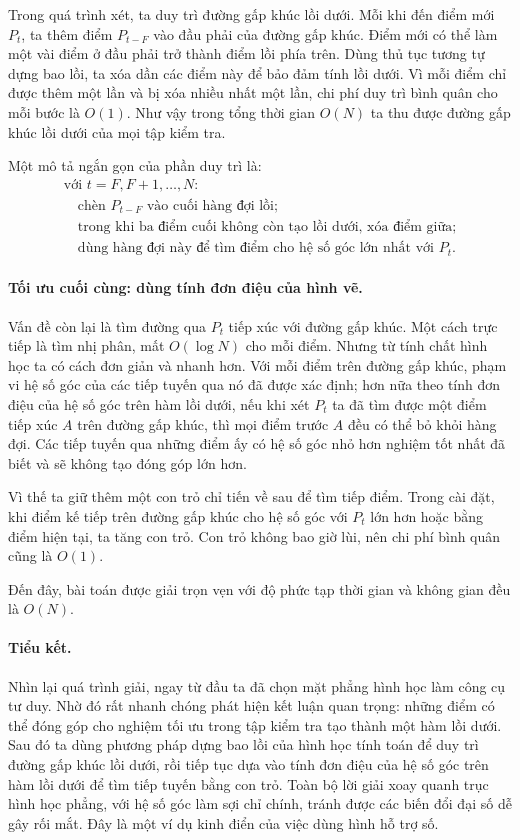 \documentclass[11pt]{article}
\begin{document}
Trong quá trình xét, ta duy trì đường gấp khúc lồi dưới. Mỗi khi đến điểm
mới $P_t$, ta thêm điểm $P_{t-F}$ vào đầu phải của đường gấp khúc. Điểm mới
có thể làm một vài điểm ở đầu phải trở thành điểm lồi phía trên. Dùng thủ
tục tương tự dựng bao lồi, ta xóa dần các điểm này để bảo đảm tính lồi dưới.
Vì mỗi điểm chỉ được thêm một lần và bị xóa nhiều nhất một lần, chi phí duy
trì bình quân cho mỗi bước là $O(1)$. Như vậy trong tổng thời gian $O(N)$ ta
thu được đường gấp khúc lồi dưới của mọi tập kiểm tra.

Một mô tả ngắn gọn của phần duy trì là:
\[
\begin{array}{l}
\text{với }t=F,F+1,\ldots,N\text{:}\\
\quad \text{chèn }P_{t-F}\text{ vào cuối hàng đợi lồi;}\\
\quad \text{trong khi ba điểm cuối không còn tạo lồi dưới, xóa điểm giữa;}\\
\quad \text{dùng hàng đợi này để tìm điểm cho hệ số góc lớn nhất với }P_t.
\end{array}
\]

\paragraph{Tối ưu cuối cùng: dùng tính đơn điệu của hình vẽ.}
Vấn đề còn lại là tìm đường qua $P_t$ tiếp xúc với đường gấp khúc. Một cách
trực tiếp là tìm nhị phân, mất $O(\log N)$ cho mỗi điểm. Nhưng từ tính chất
hình học ta có cách đơn giản và nhanh hơn. Với mỗi điểm trên đường gấp khúc,
phạm vi hệ số góc của các tiếp tuyến qua nó đã được xác định; hơn nữa theo
tính đơn điệu của hệ số góc trên hàm lồi dưới, nếu khi xét $P_t$ ta đã tìm
được một điểm tiếp xúc $A$ trên đường gấp khúc, thì mọi điểm trước $A$ đều có
thể bỏ khỏi hàng đợi. Các tiếp tuyến qua những điểm ấy có hệ số góc nhỏ hơn
nghiệm tốt nhất đã biết và sẽ không tạo đóng góp lớn hơn.

Vì thế ta giữ thêm một con trỏ chỉ tiến về sau để tìm tiếp điểm. Trong cài
đặt, khi điểm kế tiếp trên đường gấp khúc cho hệ số góc với $P_t$ lớn hơn
hoặc bằng điểm hiện tại, ta tăng con trỏ. Con trỏ không bao giờ lùi, nên chi
phí bình quân cũng là $O(1)$.

Đến đây, bài toán được giải trọn vẹn với độ phức tạp thời gian và không gian
đều là $O(N)$.

\paragraph{Tiểu kết.}
Nhìn lại quá trình giải, ngay từ đầu ta đã chọn mặt phẳng hình học làm công
cụ tư duy. Nhờ đó rất nhanh chóng phát hiện kết luận quan trọng: những điểm
có thể đóng góp cho nghiệm tối ưu trong tập kiểm tra tạo thành một hàm lồi
dưới. Sau đó ta dùng phương pháp dựng bao lồi của hình học tính toán để duy
trì đường gấp khúc lồi dưới, rồi tiếp tục dựa vào tính đơn điệu của hệ số góc
trên hàm lồi dưới để tìm tiếp tuyến bằng con trỏ. Toàn bộ lời giải xoay quanh
trục hình học phẳng, với hệ số góc làm sợi chỉ chính, tránh được các biến đổi
đại số dễ gây rối mắt. Đây là một ví dụ kinh điển của việc dùng hình hỗ trợ
số.
\end{document}
